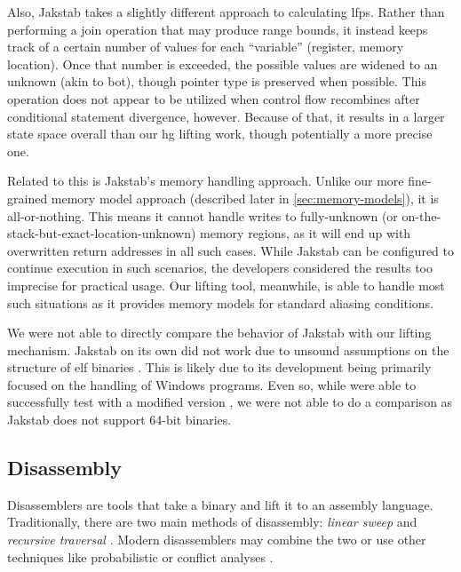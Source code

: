 Also, Jakstab takes a slightly different approach to calculating \acp{lfp}.
Rather than performing a join operation that may produce range bounds,
it instead keeps track of a certain number of values for each ``variable'' (register, memory location).
Once that number is exceeded, the possible values are widened to an unknown (akin to \gls{bot}), though pointer type is preserved when possible.
This operation does not appear to be utilized when control flow recombines
after conditional statement divergence, however.
Because of that, it results in a larger state space overall than our \ac{hg} lifting work, though potentially a more precise one.

Related to this is Jakstab's memory handling approach.
Unlike our more fine-grained memory model approach (described later in \cref{sec:memory-models}), it is all-or-nothing.
This means it cannot handle writes to fully-unknown
(or on-the-stack-but-exact-location-unknown) memory regions,
as it will end up with overwritten return addresses in all such cases.
While Jakstab can be configured to continue execution in such scenarios,
the developers considered the results too imprecise for practical usage.
Our lifting tool, meanwhile, is able to handle most such situations
as it provides memory models for standard aliasing conditions.

\begin{remark}
  We were not able to directly compare the behavior of Jakstab with our lifting mechanism.
  Jakstab on its own did not work due to unsound assumptions on the structure of \ac{elf} binaries \autocite{jakstab-error}.
  This is likely due to its development being primarily focused on the handling of Windows programs.
  Even so, while were able to successfully test with a modified version \autocite{peterson2019,peterson2019artifact}, we were not able to do a comparison as Jakstab does not support 64-bit binaries.
\end{remark}

\subsection{Disassembly}\label{related-disassembly}
Disassemblers are tools that take a binary and lift it to an assembly language.
Traditionally, there are two main methods of disassembly: \emph{linear sweep}
and \emph{recursive traversal} \autocite{schwartz2002disassembly}.
Modern disassemblers may combine the two or use other techniques like probabilistic \autocite{wartell2011differentiating,wartell2014shingled,miller2019probabilistic} or conflict analyses \autocite{khadra2016speculative}.

